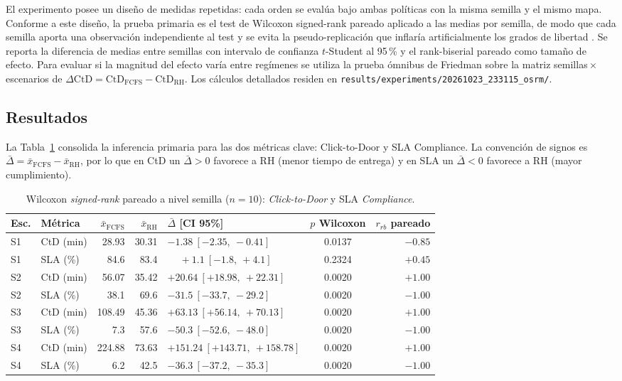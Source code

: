 \documentclass[12pt,letterpaper,oneside]{book}
\begin{document}
	El experimento posee un diseño de medidas repetidas: cada orden se
	evalúa bajo ambas políticas con la misma semilla y el mismo mapa.
	Conforme a este diseño, la prueba primaria es el test de Wilcoxon
	signed-rank pareado \citep{Wilcoxon1945} aplicado a las medias por
	semilla, de modo que cada semilla aporta una observación independiente
	al test y se evita la pseudo-replicación que inflaría artificialmente
	los grados de libertad \citep{Hurlbert1984}.  Se reporta la diferencia
	de medias entre semillas con intervalo de confianza $t$-Student al
	95\,\% y el rank-biserial pareado como tamaño de efecto.  Para evaluar
	si la magnitud del efecto varía entre regímenes se utiliza la prueba
	ómnibus de Friedman \citep{Friedman1937} sobre la matriz
	semillas\,$\times$\,escenarios de
	$\Delta\text{CtD} = \text{CtD}_{\text{FCFS}} - \text{CtD}_{\text{RH}}$.
	Los cálculos detallados residen en
	\texttt{results/experiments/20261023\_233115\_osrm/}.

	\subsection{Resultados}

	La Tabla~\ref{tab:wilcoxon_seed} consolida la inferencia primaria
	para las dos métricas clave: Click-to-Door y SLA Compliance.  La
	convención de signos es $\bar{\Delta} = \bar{x}_{\text{FCFS}} -
	\bar{x}_{\text{RH}}$, por lo que en CtD un $\bar{\Delta} > 0$ favorece
	a RH (menor tiempo de entrega) y en SLA un $\bar{\Delta} < 0$ favorece
	a RH (mayor cumplimiento).

	\begin{table}[htbp]
	\centering
	\small
	\caption{Wilcoxon \textit{signed-rank} pareado a nivel semilla ($n=10$): \textit{Click-to-Door} y SLA \textit{Compliance}.}
	\label{tab:wilcoxon_seed}
	\begin{tabular}{@{}ll rr l c r@{}}
	\toprule
	Esc. & Métrica & $\bar{x}_{\text{FCFS}}$ & $\bar{x}_{\text{RH}}$ & $\bar{\Delta}$ [CI 95\%] & $p$ Wilcoxon & $r_{rb}$ pareado \\
	\midrule
	S1 & CtD (min) & 28.93  & 30.31 & $-1.38\ [-2.35,\ -0.41]$        & 0.0137 & $-0.85$ \\
	S1 & SLA (\%)  & 84.6   & 83.4  & $\phantom{-}+1.1\ [-1.8,\ +4.1]$ & 0.2324 & $+0.45$ \\
	S2 & CtD (min) & 56.07  & 35.42 & $+20.64\ [+18.98,\ +22.31]$     & 0.0020 & $+1.00$ \\
	S2 & SLA (\%)  & 38.1   & 69.6  & $-31.5\ [-33.7,\ -29.2]$        & 0.0020 & $-1.00$ \\
	S3 & CtD (min) & 108.49 & 45.36 & $+63.13\ [+56.14,\ +70.13]$     & 0.0020 & $+1.00$ \\
	S3 & SLA (\%)  & 7.3    & 57.6  & $-50.3\ [-52.6,\ -48.0]$        & 0.0020 & $-1.00$ \\
	S4 & CtD (min) & 224.88 & 73.63 & $+151.24\ [+143.71,\ +158.78]$  & 0.0020 & $+1.00$ \\
	S4 & SLA (\%)  & 6.2    & 42.5  & $-36.3\ [-37.2,\ -35.3]$        & 0.0020 & $-1.00$ \\
	\bottomrule
	\end{tabular}
	\end{table}
\end{document}
